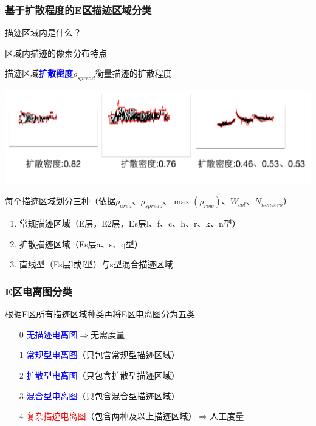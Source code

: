 \documentclass[notheorems,mathserif,table,compress]{beamer}  %
\begin{document}
\begin{frame}
\frametitle{ 基于扩散程度的E区描迹区域分类}
\begin{tcolorbox}[colback=blue!5,colframe=blue!75!black]
\begin{description}
\vspace{-0.5em}
\addtolength{\itemindent}{-2em}
\item[目的] 描迹区域内是什么？
\item[依据] 区域内描迹的像素分布特点
\item[扩散密度] 描迹区域\textcolor{blue}{\textbf{扩散密度}}$\rho_{spread}$衡量描迹的扩散程度
\vspace{-0.5em}
\end{description}
\end{tcolorbox}
\centering\includegraphics[width=0.7\linewidth]{扩散密度对比.png}

\hspace{-1em}每个描迹区域划分三种（依据$\rho_{area}$、$\rho_{spread}$、$\max{(\rho_{row})}$、$W_{col}$、$N_{nonzero}$）
\begin{enumerate}
\addtolength{\itemindent}{-1em}
\item 常规描迹区域（E层，E2层，Es层l、f、c、h、r、k、n型）
\item 扩散描迹区域（Es层a、s、q型）
\item 直线型（Es层l或f型）与s型混合描迹区域
\end{enumerate}
\end{frame}

\begin{frame}
\frametitle{ E区电离图分类}
根据E区所有描迹区域种类再将E区电离图分为五类
\begin{tcolorbox}[colback=blue!5,colframe=blue!75!black]
\begin{itemize}
\vspace{-0.5em}
\addtolength{\itemindent}{-2em}
\item[0] \textcolor{blue}{无描迹电离图}$\Rightarrow$无需度量
\item[1] \textcolor{blue}{常规型电离图}（只包含常规型描迹区域）
\item[2] \textcolor{blue}{扩散型电离图}（只包含扩散型描迹区域）
\item[3] \textcolor{blue}{混合型电离图}（只包含混合型描迹区域）
\item[4] \textcolor{red}{复杂描迹电离图}（包含两种及以上描迹区域）$\Rightarrow$人工度量
\vspace{-1em}
\end{itemize}
\end{tcolorbox}
\end{frame}
\end{document}
